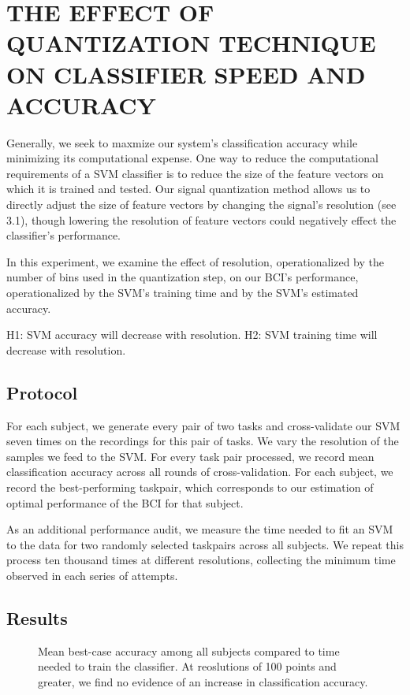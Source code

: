\section{\uppercase{The effect of quantization technique on classifier speed and accuracy}}


Generally, we seek to maxmize our system's classification accuracy while minimizing its computational expense. One way to reduce the computational requirements of a SVM classifier is to reduce the size of the feature vectors on which it is trained and tested. Our signal quantization method allows us to directly adjust the size of feature vectors by changing the signal's resolution (see 3.1), though lowering the resolution of feature vectors could negatively effect the classifier's performance.

In this experiment, we examine the effect of resolution, operationalized by the number of bins used in the quantization step, on our BCI's performance, operationalized by the SVM's training time and by the SVM's estimated accuracy. 

H1: SVM accuracy will decrease with resolution.
H2: SVM training time will decrease with resolution.

\subsection{Protocol}

For each subject, we generate every pair of two tasks and cross-validate our SVM seven times on the recordings for this pair of tasks. We vary the resolution of the samples we feed to the SVM. For every task pair processed, we record mean classification accuracy across all rounds of cross-validation. For each subject, we record the best-performing taskpair, which corresponds to our estimation of optimal performance of the BCI for that subject.

As an additional performance audit, we measure the time needed to fit an SVM to the data for two randomly selected taskpairs across all subjects. We repeat this process ten thousand times at different resolutions, collecting the minimum time observed in each series of attempts.

\subsection{Results}

\begin{figure}[!h]
  \vspace{-0.2cm}
  \centering
   {}
  \caption{Mean best-case accuracy among all subjects compared to time needed to train the classifier. At reoslutions of 100 points and greater, we find no evidence of an increase in classification accuracy. }
  \label{fig:fig1a}
  \vspace{-0.1cm}
 \end{figure}

